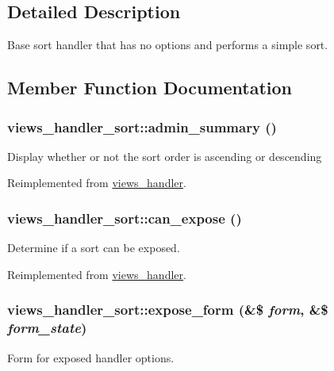 \subsection{Detailed Description}
Base sort handler that has no options and performs a simple sort. 

\subsection{Member Function Documentation}
\hypertarget{classviews__handler__sort_a94271a6ce69bf4acb37047b01f0decaa}{
\subsubsection[{admin\_\-summary}]{\setlength{\rightskip}{0pt plus 5cm}views\_\-handler\_\-sort::admin\_\-summary ()}}
\label{classviews__handler__sort_a94271a6ce69bf4acb37047b01f0decaa}
Display whether or not the sort order is ascending or descending 

Reimplemented from \hyperlink{classviews__handler_a27a5cb35f3f17322957730a95b6be11e}{views\_\-handler}.\hypertarget{classviews__handler__sort_aff131cfa9cf414c127c35ee655ee9e76}{
\subsubsection[{can\_\-expose}]{\setlength{\rightskip}{0pt plus 5cm}views\_\-handler\_\-sort::can\_\-expose ()}}
\label{classviews__handler__sort_aff131cfa9cf414c127c35ee655ee9e76}
Determine if a sort can be exposed. 

Reimplemented from \hyperlink{classviews__handler_a92517d122d69dc6f64a9edb80d55057d}{views\_\-handler}.\hypertarget{classviews__handler__sort_ace8ed050d99d5aa5eaca415201b350e9}{
\subsubsection[{expose\_\-form}]{\setlength{\rightskip}{0pt plus 5cm}views\_\-handler\_\-sort::expose\_\-form (\&\$ {\em form}, \/  \&\$ {\em form\_\-state})}}
\label{classviews__handler__sort_ace8ed050d99d5aa5eaca415201b350e9}
Form for exposed handler options. 

